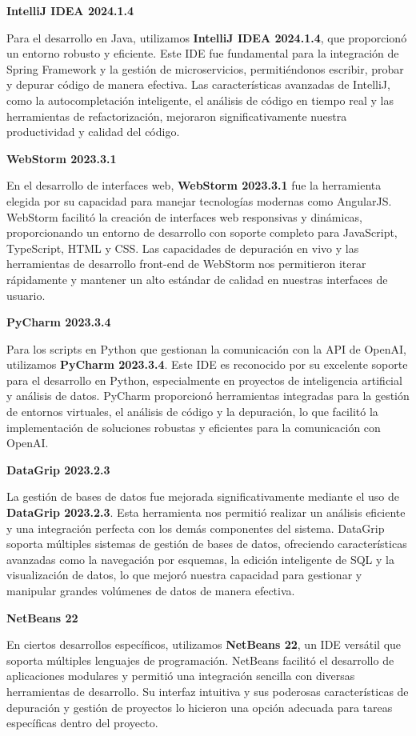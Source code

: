 \textbf{IntelliJ IDEA 2024.1.4}

Para el desarrollo en Java, utilizamos \textbf{IntelliJ IDEA 2024.1.4}, que proporcionó un entorno robusto y eficiente. Este IDE fue fundamental para la integración de Spring Framework y la gestión de microservicios, permitiéndonos escribir, probar y depurar código de manera efectiva. Las características avanzadas de IntelliJ, como la autocompletación inteligente, el análisis de código en tiempo real y las herramientas de refactorización, mejoraron significativamente nuestra productividad y calidad del código.

\textbf{WebStorm 2023.3.1}

En el desarrollo de interfaces web, \textbf{WebStorm 2023.3.1} fue la herramienta elegida por su capacidad para manejar tecnologías modernas como AngularJS. WebStorm facilitó la creación de interfaces web responsivas y dinámicas, proporcionando un entorno de desarrollo con soporte completo para JavaScript, TypeScript, HTML y CSS. Las capacidades de depuración en vivo y las herramientas de desarrollo front-end de WebStorm nos permitieron iterar rápidamente y mantener un alto estándar de calidad en nuestras interfaces de usuario.

\textbf{PyCharm 2023.3.4}

Para los scripts en Python que gestionan la comunicación con la API de OpenAI, utilizamos \textbf{PyCharm 2023.3.4}. Este IDE es reconocido por su excelente soporte para el desarrollo en Python, especialmente en proyectos de inteligencia artificial y análisis de datos. PyCharm proporcionó herramientas integradas para la gestión de entornos virtuales, el análisis de código y la depuración, lo que facilitó la implementación de soluciones robustas y eficientes para la comunicación con OpenAI.

\textbf{DataGrip 2023.2.3}

La gestión de bases de datos fue mejorada significativamente mediante el uso de \textbf{DataGrip 2023.2.3}. Esta herramienta nos permitió realizar un análisis eficiente y una integración perfecta con los demás componentes del sistema. DataGrip soporta múltiples sistemas de gestión de bases de datos, ofreciendo características avanzadas como la navegación por esquemas, la edición inteligente de SQL y la visualización de datos, lo que mejoró nuestra capacidad para gestionar y manipular grandes volúmenes de datos de manera efectiva.

\textbf{NetBeans 22}

En ciertos desarrollos específicos, utilizamos \textbf{NetBeans 22}, un IDE versátil que soporta múltiples lenguajes de programación. NetBeans facilitó el desarrollo de aplicaciones modulares y permitió una integración sencilla con diversas herramientas de desarrollo. Su interfaz intuitiva y sus poderosas características de depuración y gestión de proyectos lo hicieron una opción adecuada para tareas específicas dentro del proyecto.

